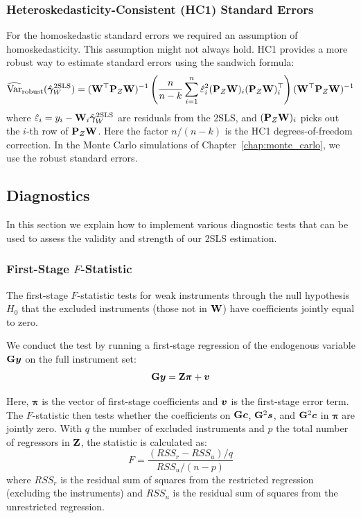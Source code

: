 \subsubsection{Heteroskedasticity-Consistent (HC1) Standard Errors}

For the homoskedastic standard errors we required an assumption of homoskedasticity. This assumption might not always hold. HC1 provides a more robust way to estimate standard errors using the sandwich formula:
\begin{equation}
\label{eq:robust_se}
    \widehat{\operatorname{Var}}_{\text{robust}}(\hat{\bm{\gamma}}_W^{\text{2SLS}}) =
    (\mathbf{W}^\top\mathbf{P}_Z\mathbf{W})^{-1}
    \left(\frac{n}{n-k}\sum_{i=1}^n \hat\varepsilon_i^2 (\mathbf{P}_Z\mathbf{W})_i (\mathbf{P}_Z\mathbf{W})_i^\top\right)
    (\mathbf{W}^\top\mathbf{P}_Z\mathbf{W})^{-1}
\end{equation}
where $\hat\varepsilon_i = y_i - \mathbf{W}_i \hat{\bm{\gamma}}_W^{\text{2SLS}}$ are residuals from the 2SLS, and $(\mathbf{P}_Z\mathbf{W})_i$ picks out the $i$-th row of $\mathbf{P}_Z\mathbf{W}$. Here the factor $n/(n-k)$ is the HC1 degrees-of-freedom correction. In the Monte Carlo simulations of Chapter~\ref{chap:monte_carlo}, we use the robust standard errors.

\subsection{Diagnostics}
\label{sec:est:diagnostics}
In this section we explain how to implement various diagnostic tests that can be used to assess the validity and strength of our 2SLS estimation.

\subsubsection{First-Stage $F$-Statistic}

The first-stage $F$-statistic tests for weak instruments through the null hypothesis $H_0$ that the excluded instruments (those not in $\mathbf{W}$) have coefficients jointly equal to zero.

We conduct the test by running a first-stage regression of the endogenous variable $\mathbf{G}\bm{y}$ on the full instrument set:
\begin{equation}
    \mathbf{G}\bm{y} = \mathbf{Z}\bm{\pi} + \bm{v}
\end{equation}

Here, $\bm{\pi}$ is the vector of first-stage coefficients and $\bm{v}$ is the first-stage error term. The $F$-statistic then tests whether the coefficients on $\mathbf{G}\bm{c}$, $\mathbf{G}^2\bm{s}$, and $\mathbf{G}^2\bm{c}$ in $\bm{\pi}$ are jointly zero. With $q$ the number of excluded instruments and $p$ the total number of regressors in $\mathbf{Z}$, the statistic is calculated as:
\begin{equation}
    F = \frac{(RSS_r - RSS_u)/q}{RSS_u/(n - p)}
\end{equation}
where $RSS_r$ is the residual sum of squares from the restricted regression (excluding the instruments) and $RSS_u$ is the residual sum of squares from the unrestricted regression.

